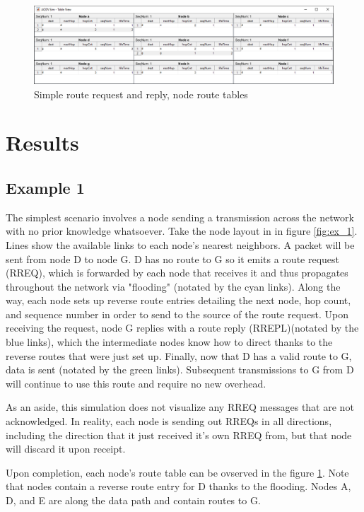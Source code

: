 \documentclass[conference]{IEEEtran}
\begin{document}
\begin{figure}
	\centering
	\includegraphics[width=6.8in]{Ex_1_table.png}
	\caption{Simple route request and reply, node route tables}
	\label{fig:ex_1_table}
\end{figure}

\section{Results}

\subsection{Example 1}

The simplest scenario involves a node sending a transmission across the network with no prior knowledge whatsoever. Take the node layout in in figure \ref{fig:ex_1}. Lines show the available links to each node's nearest neighbors. A packet will be sent from node D to node G. D has no route to G so it emits a route request (RREQ), which is forwarded by each node that receives it and thus propagates throughout the network via "flooding" (notated by the cyan links). Along the way, each node sets up reverse route entries detailing the next node, hop count, and sequence number in order to send to the source of the route request. Upon receiving the request, node G replies with a route reply (RREPL)(notated by the blue links), which the intermediate nodes know how to direct thanks to the reverse routes that were just set up. Finally, now that D has a valid route to G, data is sent (notated by the green links). Subsequent transmissions to G from D will continue to use this route and require no new overhead.

As an aside, this simulation does not visualize any RREQ messages that are not acknowledged. In reality, each node is sending out RREQs in all directions, including the direction that it just received it's own RREQ from, but that node will discard it upon receipt.

Upon completion, each node's route table can be ovserved in the figure \ref{fig:ex_1_table}. Note that nodes contain a reverse route entry for D thanks to the flooding. Nodes  A, D, and E are along the data path and contain routes to G.
\end{document}
